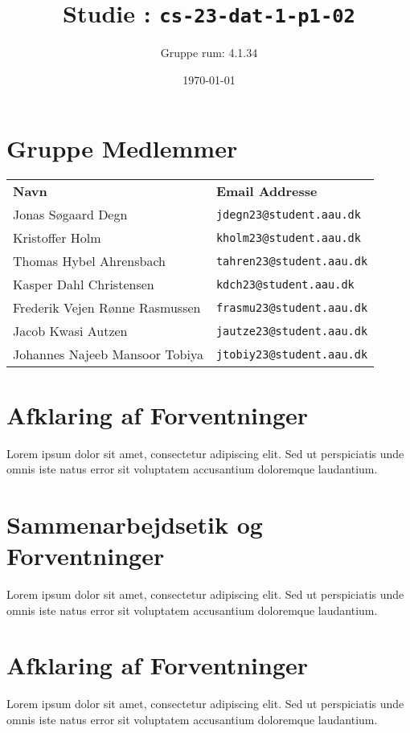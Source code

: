 \documentclass{article}
\begin{document}
\title{Studie : \texttt{cs-23-dat-1-p1-02}}
\author{Gruppe rum: 4.1.34}
\date{\today}
\maketitle

\section*{Gruppe Medlemmer}
\begin{tabular}{ll}
\textbf{Navn} & \textbf{Email Addresse} \\
Jonas Søgaard Degn & \texttt{jdegn23@student.aau.dk} \\
Kristoffer Holm & \texttt{kholm23@student.aau.dk} \\
Thomas Hybel Ahrensbach & \texttt{tahren23@student.aau.dk} \\
Kasper Dahl Christensen & \texttt{kdch23@student.aau.dk} \\
Frederik Vejen Rønne Rasmussen & \texttt{frasmu23@student.aau.dk} \\
Jacob Kwasi Autzen & \texttt{jautze23@student.aau.dk} \\
Johannes Najeeb Mansoor Tobiya & \texttt{jtobiy23@student.aau.dk} \\
\end{tabular}



\section*{Afklaring af Forventninger}
Lorem ipsum dolor sit amet, consectetur adipiscing elit. Sed ut perspiciatis unde omnis iste natus error sit voluptatem accusantium doloremque laudantium.


\section*{Sammenarbejdsetik og Forventninger}
Lorem ipsum dolor sit amet, consectetur adipiscing elit. Sed ut perspiciatis unde omnis iste natus error sit voluptatem accusantium doloremque laudantium.


\section*{Afklaring af Forventninger}
Lorem ipsum dolor sit amet, consectetur adipiscing elit. Sed ut perspiciatis unde omnis iste natus error sit voluptatem accusantium doloremque laudantium.
\end{document}
